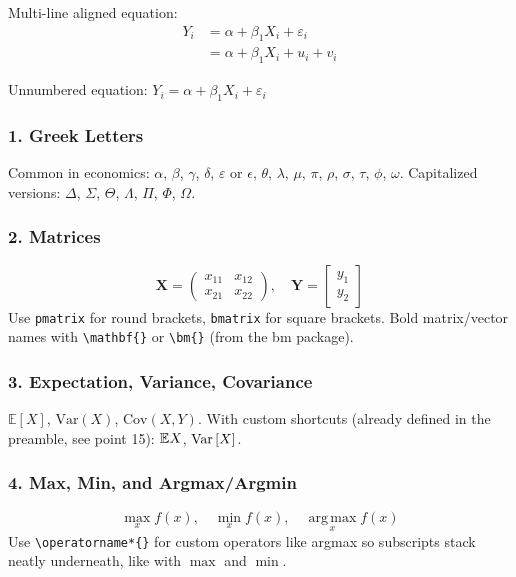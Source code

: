 Multi-line aligned equation:
\begin{align}
    Y_i &= \alpha + \beta_1 X_i + \varepsilon_i \\
        &= \alpha + \beta_1 X_i + u_i + v_i
\end{align}

Unnumbered equation: \(\displaystyle Y_i = \alpha + \beta_1 X_i + \varepsilon_i\)

\subsubsection*{1. Greek Letters}
Common in economics: \(\alpha\), \(\beta\), \(\gamma\), \(\delta\), \(\varepsilon\) or \(\epsilon\), \(\theta\), \(\lambda\), \(\mu\), \(\pi\), \(\rho\), \(\sigma\), \(\tau\), \(\phi\), \(\omega\).
Capitalized versions: \(\Delta\), \(\Sigma\), \(\Theta\), \(\Lambda\), \(\Pi\), \(\Phi\), \(\Omega\).

\subsubsection*{2. Matrices}
\[
\mathbf{X} = \begin{pmatrix} x_{11} & x_{12} \\ x_{21} & x_{22} \end{pmatrix}, \quad
\mathbf{Y} = \begin{bmatrix} y_1 \\ y_2 \end{bmatrix}
\]
Use \verb|pmatrix| for round brackets, \verb|bmatrix| for square brackets. Bold matrix/vector names with \verb|\mathbf{}| or \verb|\bm{}| (from the bm package).

\subsubsection*{3. Expectation, Variance, Covariance}
\(\mathbb{E}[X]\), \(\mathrm{Var}(X)\), \(\mathrm{Cov}(X,Y)\).
With custom shortcuts (already defined in the preamble, see point 15): \(\mathbb{E}{X}\), \(\mathrm{Var}\left[X\right]\).

\subsubsection*{4. Max, Min, and Argmax/Argmin}
\[
\max_{x} f(x), \quad \min_{x} f(x), \quad \operatorname*{arg\,max}_{x} f(x)
\]
Use \verb|\operatorname*{}| for custom operators like argmax so subscripts stack neatly underneath, like with \(\max\) and \(\min\).

